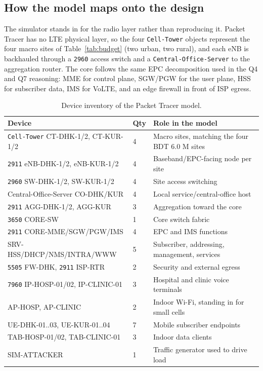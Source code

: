 \documentclass[9pt,a4paper]{article}
\begin{document}
\subsection{How the model maps onto the design}
The simulator stands in for the radio layer rather than reproducing it. Packet Tracer has no
LTE physical layer, so the four \texttt{Cell-Tower} objects represent the four macro sites of
Table~\ref{tab:budget} (two urban, two rural), and each eNB is backhauled through a
\texttt{2960} access switch and a \texttt{Central-Office-Server} to the aggregation router.
The core follows the same EPC decomposition used in the Q4 and Q7 reasoning: MME for control
plane, SGW/PGW for the user plane, HSS for subscriber data, IMS for VoLTE, and an edge firewall
in front of ISP egress.

\begin{table}[H]\centering\footnotesize
\caption{Device inventory of the Packet Tracer model.}
\label{tab:ptinv}
\begin{tabularx}{\textwidth}{@{}p{5.3cm}p{0.8cm}X@{}}
\toprule
\textbf{Device} & \textbf{Qty} & \textbf{Role in the model} \\
\midrule
\texttt{Cell-Tower} CT-DHK-1/2, CT-KUR-1/2 & 4 & Macro sites, matching the four BDT 6.0 M sites \\
\texttt{2911} eNB-DHK-1/2, eNB-KUR-1/2 & 4 & Baseband/EPC-facing node per site \\
\texttt{2960} SW-DHK-1/2, SW-KUR-1/2 & 4 & Site access switching \\
Central-Office-Server CO-DHK/KUR & 4 & Local service/central-office host \\
\texttt{2911} AGG-DHK-1/2, AGG-KUR & 3 & Aggregation toward the core \\
\texttt{3650} CORE-SW & 1 & Core switch fabric \\
\texttt{2911} CORE-MME/SGW/PGW/IMS & 4 & EPC and IMS functions \\
SRV-HSS/DHCP/NMS/INTRA/WWW & 5 & Subscriber, addressing, management, services \\
\texttt{5505} FW-DHK, \texttt{2911} ISP-RTR & 2 & Security and external egress \\
\texttt{7960} IP-HOSP-01/02, IP-CLINIC-01 & 3 & Hospital and clinic voice terminals \\
AP-HOSP, AP-CLINIC & 2 & Indoor Wi-Fi, standing in for small cells \\
UE-DHK-01..03, UE-KUR-01..04 & 7 & Mobile subscriber endpoints \\
TAB-HOSP-01/02, TAB-CLINIC-01 & 3 & Indoor data clients \\
SIM-ATTACKER & 1 & Traffic generator used to drive load \\
\bottomrule
\end{tabularx}
\end{table}
\end{document}
